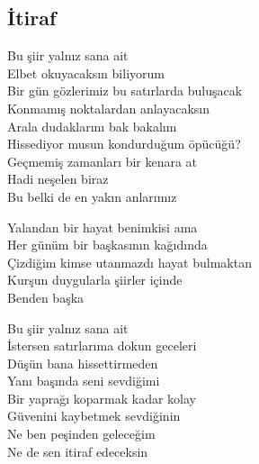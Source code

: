 \subsection{İtiraf}

Bu şiir yalnız sana ait \\
Elbet okuyacaksın biliyorum \\
Bir gün gözlerimiz bu satırlarda buluşacak \\
Konmamış noktalardan anlayacaksın \\
Arala dudaklarını bak bakalım \\
Hissediyor musun kondurduğum öpücüğü? \\
Geçmemiş zamanları bir kenara at \\
Hadi neşelen biraz \\
Bu belki de en yakın anlarımız

\noindent\newline
Yalandan bir hayat benimkisi ama \\
Her günüm bir başkasının kağıdında \\
Çizdiğim kimse utanmazdı hayat bulmaktan \\
Kurşun duygularla şiirler içinde \\
Benden başka

\noindent\newline
Bu şiir yalnız sana ait \\
İstersen satırlarıma dokun geceleri \\
Düşün bana hissettirmeden \\
Yanı başında seni sevdiğimi \\
Bir yaprağı koparmak kadar kolay \\
Güvenini kaybetmek sevdiğinin \\
Ne ben peşinden geleceğim \\
Ne de sen itiraf edeceksin